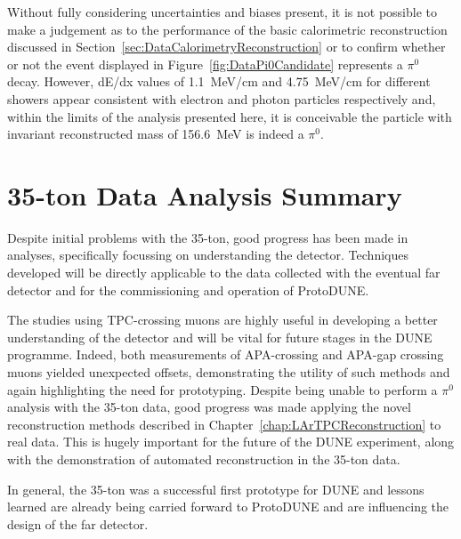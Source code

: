 Without fully considering uncertainties and biases present, it is not possible to make a judgement as to the performance of the basic calorimetric reconstruction discussed in Section~\ref{sec:DataCalorimetryReconstruction} or to confirm whether or not the event displayed in Figure~\ref{fig:DataPi0Candidate} represents a $\pi^0$ decay.  However, dE/dx values of 1.1~MeV/cm and 4.75~MeV/cm for different showers appear consistent with electron and photon particles respectively and, within the limits of the analysis presented here, it is conceivable the particle with invariant reconstructed mass of 156.6~MeV is indeed a $\pi^0$.

\section{35-ton Data Analysis Summary}\label{sec:35tonDataSummary}

Despite initial problems with the 35-ton, good progress has been made in analyses, specifically focussing on understanding the detector.  Techniques developed will be directly applicable to the data collected with the eventual far detector and for the commissioning and operation of ProtoDUNE.

The studies using TPC-crossing muons are highly useful in developing a better understanding of the detector and will be vital for future stages in the DUNE programme.  Indeed, both measurements of APA-crossing and APA-gap crossing muons yielded unexpected offsets, demonstrating the utility of such methods and again highlighting the need for prototyping.  Despite being unable to perform a $\pi^0$ analysis with the 35-ton data, good progress was made applying the novel reconstruction methods described in Chapter~\ref{chap:LArTPCReconstruction} to real data.  This is hugely important for the future of the DUNE experiment, along with the demonstration of automated reconstruction in the 35-ton data.

In general, the 35-ton was a successful first prototype for DUNE and lessons learned are already being carried forward to ProtoDUNE and are influencing the design of the far detector.
